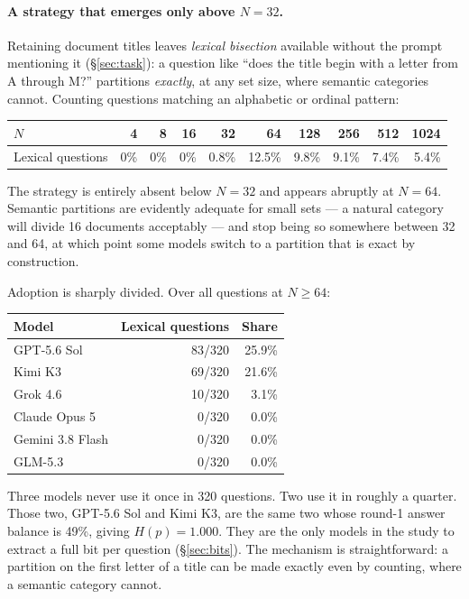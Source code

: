 \documentclass[11pt]{article}
\begin{document}
\paragraph{A strategy that emerges only above $N{=}32$.} Retaining document
titles leaves \emph{lexical bisection} available without the prompt mentioning
it (\S\ref{sec:task}): a question
like ``does the title begin with a letter from A through M?'' partitions
\emph{exactly}, at any set size, where semantic categories cannot. Counting
questions matching an alphabetic or ordinal pattern:

\begin{center}\small
\begin{tabular}{lrrrrrrrrr}
\toprule
$N$ & 4 & 8 & 16 & 32 & 64 & 128 & 256 & 512 & 1024 \\
\midrule
Lexical questions & 0\% & 0\% & 0\% & 0.8\% & 12.5\% & 9.8\% & 9.1\% & 7.4\% & 5.4\% \\
\bottomrule
\end{tabular}
\end{center}

The strategy is entirely absent below $N{=}32$ and appears abruptly at
$N{=}64$. Semantic partitions are evidently adequate for small sets --- a
natural category will divide 16 documents acceptably --- and stop being so
somewhere between 32 and 64, at which point some models switch to a partition
that is exact by construction.

Adoption is sharply divided. Over all questions at $N\ge64$:

\begin{center}\small
\begin{tabular}{lrr}
\toprule
Model & Lexical questions & Share \\
\midrule
GPT-5.6 Sol      & 83/320 & 25.9\% \\
Kimi K3          & 69/320 & 21.6\% \\
Grok 4.6         & 10/320 &  3.1\% \\
Claude Opus 5    &  0/320 &  0.0\% \\
Gemini 3.8 Flash &  0/320 &  0.0\% \\
GLM-5.3          &  0/320 &  0.0\% \\
\bottomrule
\end{tabular}
\end{center}

Three models never use it once in 320 questions. Two use it in roughly a
quarter. Those two, GPT-5.6 Sol and Kimi K3, are the same two whose round-1
answer balance is 49\%, giving $H(p)=1.000$. They are the only models in the
study to extract a full bit per question (\S\ref{sec:bits}). The mechanism is
straightforward: a partition on the first letter of a title can be made exactly
even by counting, where a semantic category cannot.
\end{document}
